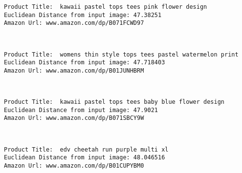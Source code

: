 \documentclass[11pt]{article}
\begin{document}
    \begin{Verbatim}[commandchars=\\\{\}]
Product Title:  kawaii pastel tops tees pink flower design 
Euclidean Distance from input image: 47.38251
Amazon Url: www.amazon.com/dp/B071FCWD97

    \end{Verbatim}

    \begin{center}
    \end{center}
    { \hspace*{\fill} \\}
    
    \begin{Verbatim}[commandchars=\\\{\}]
Product Title:  womens thin style tops tees pastel watermelon print 
Euclidean Distance from input image: 47.718403
Amazon Url: www.amazon.com/dp/B01JUNHBRM

    \end{Verbatim}

    \begin{center}
    \end{center}
    { \hspace*{\fill} \\}
    
    \begin{Verbatim}[commandchars=\\\{\}]
Product Title:  kawaii pastel tops tees baby blue flower design 
Euclidean Distance from input image: 47.9021
Amazon Url: www.amazon.com/dp/B071SBCY9W

    \end{Verbatim}

    \begin{center}
    \end{center}
    { \hspace*{\fill} \\}
    
    \begin{Verbatim}[commandchars=\\\{\}]
Product Title:  edv cheetah run purple multi xl 
Euclidean Distance from input image: 48.046516
Amazon Url: www.amazon.com/dp/B01CUPYBM0

    \end{Verbatim}
\end{document}
